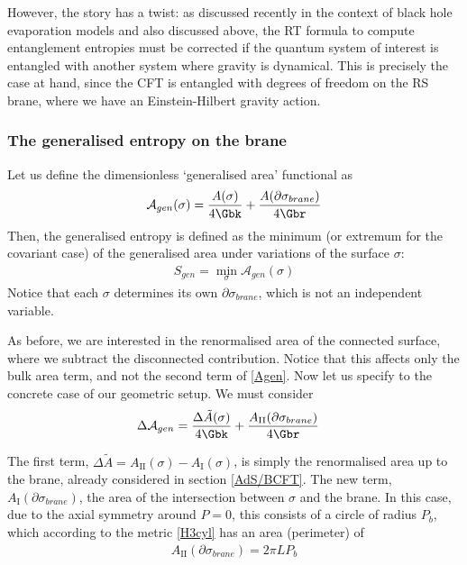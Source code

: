 However, the story has a twist: as discussed recently in the context of black hole evaporation models and also discussed above, the RT formula to compute entanglement entropies must be corrected if the quantum system of interest is entangled with another system where gravity is dynamical. This is precisely the case at hand, since the CFT is entangled with degrees of freedom on the RS brane, where we have an Einstein-Hilbert gravity action.


\subsubsection{The generalised entropy on the brane}\label{sec:generalised}

Let us define the dimensionless `generalised area' functional as
\begin{align}\label{Agen}
\mathcal{A}_{gen}(\sigma)=\frac{A(\sigma)}{4\Gbk}+\frac{A(\partial\sigma_{brane})}{4\Gbr}
\end{align}
Then, the generalised entropy is defined as the minimum (or extremum for the covariant case) of the generalised area under variations of the surface $\sigma$:
\begin{align}\label{}
S_{gen}=\min_{\sigma} \mathcal{A}_{gen}(\sigma)
\end{align}
Notice that each $\sigma$ determines its own $\partial\sigma_{brane}$, which is not an independent variable.

As before, we are interested in the renormalised area of the connected surface, where we subtract the disconnected contribution. Notice that this affects only the bulk area term, and not the second term of \eqref{Agen}. Now let us specify to the concrete case of our geometric setup. We must consider
\begin{align}\label{dAgen}
\Delta \mathcal{A}_{gen}&=\frac{\Delta \tilde A(\sigma)}{4\Gbk}+\frac{A_{\text{II}}(\partial\sigma_{brane})}{4\Gbr}
\end{align}

The first term, $\Delta \tilde A=A_{\text{II}}(\sigma)-A_{\text{I}}(\sigma)$, is simply the renormalised area up to the brane, already considered in section \ref{AdS/BCFT}. The new term, $A_{\text{I}}(\partial\sigma_{brane})$, the area of the intersection between $\sigma$ and the brane. In this case, due to the axial symmetry around $P=0$, this consists of a circle of radius $P_b$, which according to the metric \eqref{H3cyl} has an area (perimeter) of
\begin{align}\label{ring}
A_{\text{II}}(\partial\sigma_{brane})=2\pi L P_b
\end{align}


